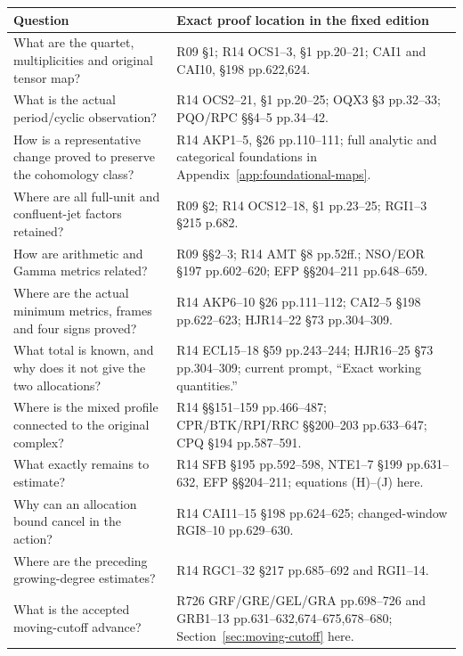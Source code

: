 {
\begin{longtable}[]{@{}
  >{\raggedright\arraybackslash}p{}
  >{\raggedright\arraybackslash}p{}@{}}
\toprule\noalign{}
\begin{minipage}[b]{\linewidth}\raggedright
Question
\end{minipage} & \begin{minipage}[b]{\linewidth}\raggedright
Exact proof location in the fixed edition
\end{minipage} \\
\midrule\noalign{}
\endhead
\bottomrule\noalign{}
\endlastfoot
What are the quartet, multiplicities and original tensor map? & R09 §1; R14 OCS1--3, §1 pp.20--21; CAI1 and CAI10, §198 pp.622,624. \\
What is the actual period/cyclic observation? & R14 OCS2--21, §1 pp.20--25; OQX3 §3 pp.32--33; PQO/RPC §§4--5 pp.34--42. \\
How is a representative change proved to preserve the cohomology class? & R14 AKP1--5, §26 pp.110--111; full analytic and categorical foundations in Appendix~\ref{app:foundational-maps}. \\
Where are all full-unit and confluent-jet factors retained? & R09 §2; R14 OCS12--18, §1 pp.23--25; RGI1--3 §215 p.682. \\
How are arithmetic and Gamma metrics related? & R09 §§2--3; R14 AMT §8 pp.52ff.; NSO/EOR §197 pp.602--620; EFP §§204--211 pp.648--659. \\
Where are the actual minimum metrics, frames and four signs proved? & R14 AKP6--10 §26 pp.111--112; CAI2--5 §198 pp.622--623; HJR14--22 §73 pp.304--309. \\
What total is known, and why does it not give the two allocations? & R14 ECL15--18 §59 pp.243--244; HJR16--25 §73 pp.304--309; current prompt, ``Exact working quantities.'' \\
Where is the mixed profile connected to the original complex? & R14 §§151--159 pp.466--487; CPR/BTK/RPI/RRC §§200--203 pp.633--647; CPQ §194 pp.587--591. \\
What exactly remains to estimate? & R14 SFB §195 pp.592--598, NTE1--7 §199 pp.631--632, EFP §§204--211; equations (H)--(J) here. \\
Why can an allocation bound cancel in the action? & R14 CAI11--15 §198 pp.624--625; changed-window RGI8--10 pp.629--630. \\
Where are the preceding growing-degree estimates? & R14 RGC1--32 §217 pp.685--692 and RGI1--14. \\
What is the accepted moving-cutoff advance? & R726 GRF/GRE/GEL/GRA pp.698--726 and GRB1--13 pp.631--632,674--675,678--680; Section~\ref{sec:moving-cutoff} here. \\
\end{longtable}
}

